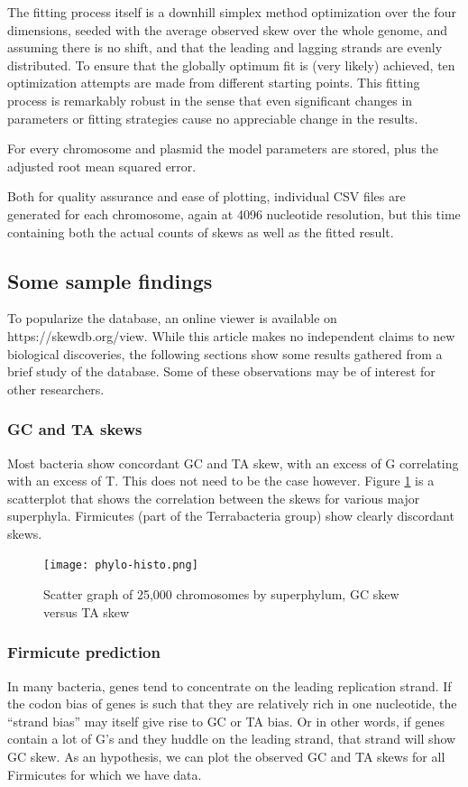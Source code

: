 \documentclass[fleqn,10pt]{wlscirep}
\begin{document}
The fitting process itself is a downhill simplex method optimization\cite{Nelder1965} over the four dimensions, seeded with the average observed skew over the whole genome, and assuming there is no shift, and that the leading and lagging strands are evenly distributed. To ensure that the globally optimum fit is (very likely) achieved, ten optimization attempts are made from different starting points. This fitting process is remarkably robust in the sense that even significant changes in parameters or fitting strategies cause no appreciable change in the results. 

For every chromosome and plasmid the model parameters are stored, plus the adjusted root mean squared error.

Both for quality assurance and ease of plotting, individual CSV files are generated for each chromosome, again at 4096 nucleotide resolution, but this time containing both the actual counts of skews as well as the fitted result.
  
\subsection*{Some sample findings}
To popularize the database, an online viewer is available on https://skewdb.org/view. While this article makes no independent claims to new biological discoveries, the following sections show some results gathered from a brief study of the database. Some of these observations may be of interest for other researchers.
\subsubsection*{GC and TA skews}
Most bacteria show concordant GC and TA skew, with an excess of G correlating with an excess of T. This does not need to be the case however. Figure \ref{fig:gc-ta-scatter} is a scatterplot that shows the correlation between the skews for various major superphyla. Firmicutes (part of the Terrabacteria group) show clearly discordant skews.

\begin{figure}[ht]
\centering
\texttt{[image: phylo-histo.png]}
\caption{Scatter graph of 25,000 chromosomes by superphylum, GC skew versus TA skew}
\label{fig:gc-ta-scatter}
\end{figure}


\subsubsection*{Firmicute prediction}
In many bacteria, genes tend to concentrate on the leading replication strand. If the codon bias of genes is such that they are relatively rich in one nucleotide, the ``strand bias'' may itself give rise to GC or TA bias. Or in other words, if genes contain a lot of G's and they huddle on the leading strand, that strand will show GC skew. As an hypothesis, we can plot the observed GC and TA skews for all Firmicutes for which we have data.
\end{document}
